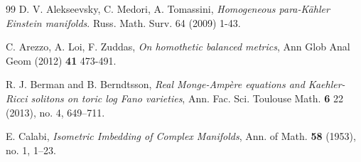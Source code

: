 \documentclass[11pt, reqno]{amsart}
\newcommand{\K }{K\"{a}hler }
\begin{document}
\small{\begin{thebibliography}{99}
  D. V.   Alekseevsky, C. Medori, A. Tomassini, 
\emph{Homogeneous para-Kähler Einstein manifolds}. Russ. Math. Surv. 64  (2009) 1-43.
%
%

%
 

 C. Arezzo, A. Loi, F. Zuddas, \emph{On homothetic balanced metrics}, Ann Glob Anal Geom (2012) \textbf{41} 473-491.




 R. J. Berman and B. Berndtsson, \emph{Real Monge-Ampère equations and Kaehler-Ricci solitons on toric log Fano varieties}, Ann. Fac. Sci. Toulouse Math. \textbf{6} 22 (2013), no. 4, 649–711.



 E. Calabi,  \emph{Isometric Imbedding of Complex Manifolds}, Ann. of Math. \textbf{58} (1953), no. 1, 1--23.




\end{thebibliography}}
\end{document}

